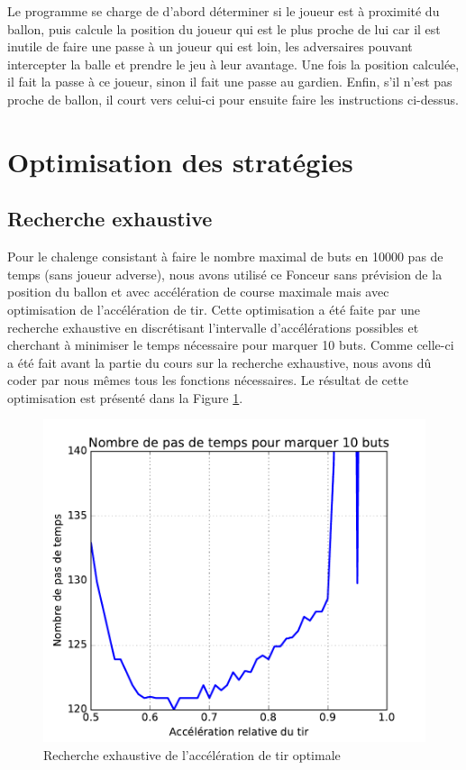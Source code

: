 \documentclass[a4paper,12pt]{article}
\numberwithin{equation}{section}
\begin{document}
Le programme se charge de d’abord déterminer si le joueur est à proximité du ballon, puis calcule la position du joueur qui est le plus proche de lui car il est inutile de faire une passe à un joueur qui est loin, les adversaires pouvant intercepter la balle et prendre le jeu à leur avantage. Une fois la position calculée, il fait la passe à ce joueur, sinon il fait une passe au gardien. Enfin, s’il n’est pas proche de ballon, il court vers celui-ci pour ensuite faire les instructions ci-dessus.



\section{Optimisation des stratégies}
\label{4}


\subsection{Recherche exhaustive}

Pour le chalenge consistant à faire le nombre maximal de buts en 10000 pas de temps (sans joueur adverse), nous avons utilisé ce Fonceur sans prévision de la position du ballon et avec accélération de course maximale mais avec optimisation de l'accélération de tir. Cette optimisation a été faite par une recherche exhaustive en discrétisant l’intervalle d'accélérations possibles et cherchant à minimiser le temps nécessaire pour marquer 10 buts. Comme celle-ci a été fait avant la partie du cours sur la recherche exhaustive, nous avons dû coder par nous mêmes tous les fonctions nécessaires. Le résultat de cette optimisation est présenté dans la Figure \ref{Figure2}. 

\begin{figure}[ht]
\centering
\includegraphics[scale = 0.67]{param_search_chalenge}
\caption{Recherche exhaustive de l'accélération de tir optimale}
\label{Figure2}
\end{figure}
\end{document}
